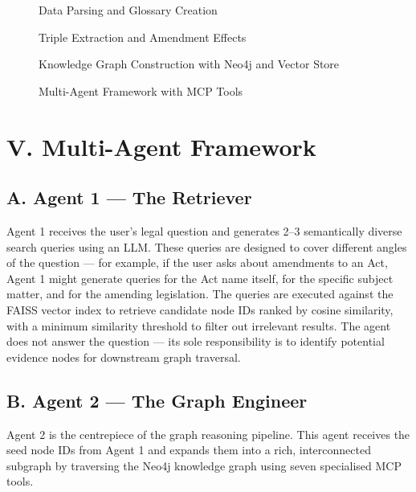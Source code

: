 \documentclass[10pt, a4paper, twocolumn]{article}
\begin{document}
\begin{figure}[t]
\centering
\vspace{6cm} %
\caption{Data Parsing and Glossary Creation}
\end{figure}

\begin{figure}[t]
\centering
\vspace{6cm} %
\caption{Triple Extraction and Amendment Effects}
\end{figure}

\begin{figure}[t]
\centering
\vspace{6cm} %
\caption{Knowledge Graph Construction with Neo4j and Vector Store}
\end{figure}

\begin{figure}[t]
\centering
\vspace{6cm} %
\caption{Multi-Agent Framework with MCP Tools}
\end{figure}

\clearpage

\section{V. Multi-Agent Framework}

\subsection{A. Agent 1 — The Retriever}
Agent 1 receives the user's legal question and generates 2–3 semantically diverse search queries using an LLM. These queries are designed to cover different angles of the question — for example, if the user asks about amendments to an Act, Agent 1 might generate queries for the Act name itself, for the specific subject matter, and for the amending legislation. The queries are executed against the FAISS vector index to retrieve candidate node IDs ranked by cosine similarity, with a minimum similarity threshold to filter out irrelevant results. The agent does not answer the question — its sole responsibility is to identify potential evidence nodes for downstream graph traversal.

\subsection{B. Agent 2 — The Graph Engineer}
Agent 2 is the centrepiece of the graph reasoning pipeline. This agent receives the seed node IDs from Agent 1 and expands them into a rich, interconnected subgraph by traversing the Neo4j knowledge graph using seven specialised MCP tools.
\end{document}
